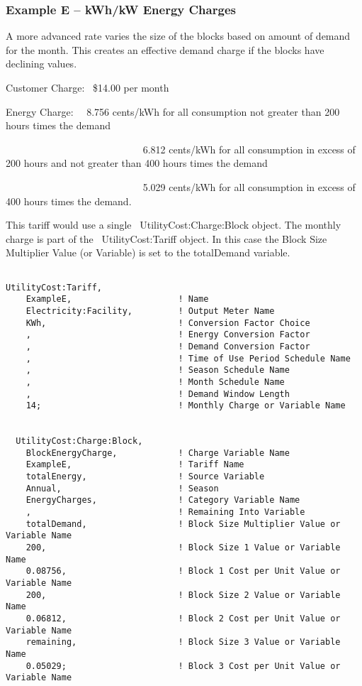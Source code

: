 \subsubsection{Example E -- kWh/kW Energy Charges}\label{example-e-kwhkw-energy-charges}

A more advanced rate varies the size of the blocks based on amount of demand for the month. This creates an effective demand charge if the blocks have declining values.

Customer Charge:~ \$14.00 per month

Energy Charge:~~ 8.756 cents/kWh for all consumption not greater than 200 hours times the demand

~~~~~~~~~~~~~~~~~~~~~~~~~~~ 6.812 cents/kWh for all consumption in excess of 200 hours and not greater than 400 hours times the demand

~~~~~~~~~~~~~~~~~~~~~~~~~~~ 5.029 cents/kWh for all consumption in excess of 400 hours times the demand.

This tariff would use a single ~UtilityCost:Charge:Block object. The monthly charge is part of the ~UtilityCost:Tariff object. In this case the Block Size Multiplier Value (or Variable) is set to the totalDemand variable.

\begin{lstlisting}

UtilityCost:Tariff,
    ExampleE,                     ! Name
    Electricity:Facility,         ! Output Meter Name
    KWh,                          ! Conversion Factor Choice
    ,                             ! Energy Conversion Factor
    ,                             ! Demand Conversion Factor
    ,                             ! Time of Use Period Schedule Name
    ,                             ! Season Schedule Name
    ,                             ! Month Schedule Name
    ,                             ! Demand Window Length
    14;                           ! Monthly Charge or Variable Name


  UtilityCost:Charge:Block,
    BlockEnergyCharge,            ! Charge Variable Name
    ExampleE,                     ! Tariff Name
    totalEnergy,                  ! Source Variable
    Annual,                       ! Season
    EnergyCharges,                ! Category Variable Name
    ,                             ! Remaining Into Variable
    totalDemand,                  ! Block Size Multiplier Value or Variable Name
    200,                          ! Block Size 1 Value or Variable Name
    0.08756,                      ! Block 1 Cost per Unit Value or Variable Name
    200,                          ! Block Size 2 Value or Variable Name
    0.06812,                      ! Block 2 Cost per Unit Value or Variable Name
    remaining,                    ! Block Size 3 Value or Variable Name
    0.05029;                      ! Block 3 Cost per Unit Value or Variable Name
\end{lstlisting}

